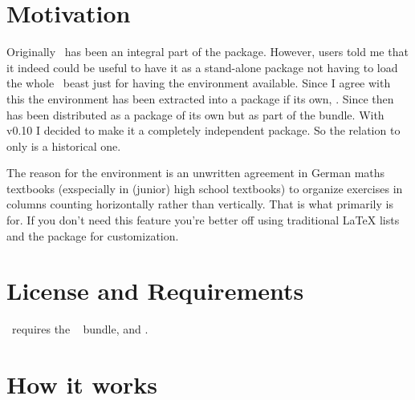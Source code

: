 \documentclass[load-preamble+]{cnltx-doc}
\begin{document}
\section{Motivation}
Originally \Tasks\ has been an integral part of the
\ExSheets{} package.  However, users told me that it indeed
could be useful to have it as a stand-alone package not having to load the
whole \ExSheets\ beast just for having the  environment available.
Since I agree with this the environment has been extracted into a package if
its own, \Tasks.  Since then \Tasks{} has been distributed as a package of its
own but as part of the \ExSheets{} bundle.  With v0.10 I
decided to make it a completely independent package.  So the relation to
\ExSheets{} only is a historical one.

The reason for the  environment is an unwritten agreement in German
maths textbooks (exspecially in (junior) high school textbooks) to organize
exercises in columns counting horizontally rather than vertically.  That is
what  primarily is for. If you don't need this feature you're
better off using traditional \LaTeX{} lists and the  package for
customization.

\section{License and Requirements}\label{sec:license}
\license

\Tasks\ requires the ~\cite{bnd:l3kernel} bundle,
 and .%


\section{How it works}
\end{document}
